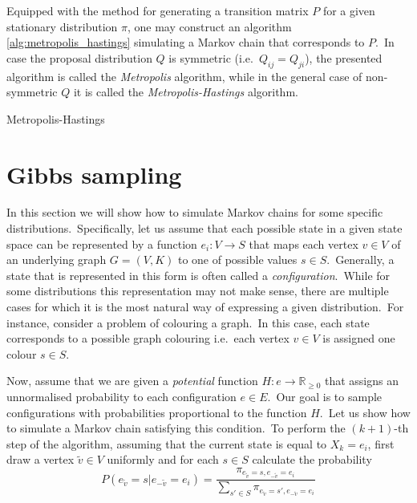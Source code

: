\documentclass[a4paper, 11pt, onecolumn, openany, titlepage]{report}
\theoremstyle{default_theorem_style}\newtheorem{theorem}{Theorem}
\theoremstyle{default_theorem_style}\newtheorem{definition}{Definition}
\begin{document}
Equipped with the method for generating a transition matrix $P$ for a given stationary distribution $\pi$, one may
construct an algorithm \ref{alg:metropolis_hastings} simulating a Markov chain that corresponds to $P$.\ In case the
proposal distribution $Q$ is symmetric (i.e.\ $Q_{ij} = Q_{ji}$), the presented algorithm is called the
\textit{Metropolis} algorithm, while in the general case of non-symmetric $Q$ it is called the
\textit{Metropolis-Hastings} algorithm.\newline


\begin{algorithm}[tb]
\caption{Metropolis-Hastings}\label{alg:metropolis_hastings}
\begin{algorithmic}[1]
\Else
\EndIf
{}
\end{algorithmic}
\end{algorithm}

\section{Gibbs sampling}\label{section:gibbs_sampling}

In this section we will show how to simulate Markov chains for some specific distributions.\ Specifically, let us assume
that each possible state in a given state space can be represented by a function $e_i : V \to S$ that maps each vertex
$v \in V$ of an underlying graph $G = (V, K)$ to one of possible values $s \in S$.\ Generally, a state that is
represented in this form is often called a \textit{configuration}.\ While for some distributions this
representation may not make sense, there are multiple cases for which it is the most natural way of expressing a
given distribution.\ For instance, consider a problem of colouring a graph.\ In this case, each state corresponds to a
possible graph colouring i.e.\ each vertex $v \in V$ is assigned one colour $s \in S$.\newline

Now, assume that we are given a \textit{potential} function $H : e \to \mathbb R_{\geq 0}$ that assigns an
unnormalised probability to each configuration $e \in E$.\ Our goal is to sample configurations with
probabilities proportional to the function $H$.\ Let us show how to simulate a Markov chain satisfying this
condition.\ To perform the $(k + 1)$-th step of the algorithm, assuming that the current state is equal to
$X_k = e_i$, first draw a vertex $\tilde{v} \in V$ uniformly and for each $s \in S$ calculate the probability
$$
P(e_{\tilde{v}} = s | e_{-\tilde{v}} = e_i) = \frac{\pi_{e_{\tilde{v}} =
s,e_{-\tilde{v}} = e_i}}{\sum_{s' \in S} \pi_{e_{\tilde{v}} = s', e_{-\tilde{v}} = e_i}}
$$
\end{document}
